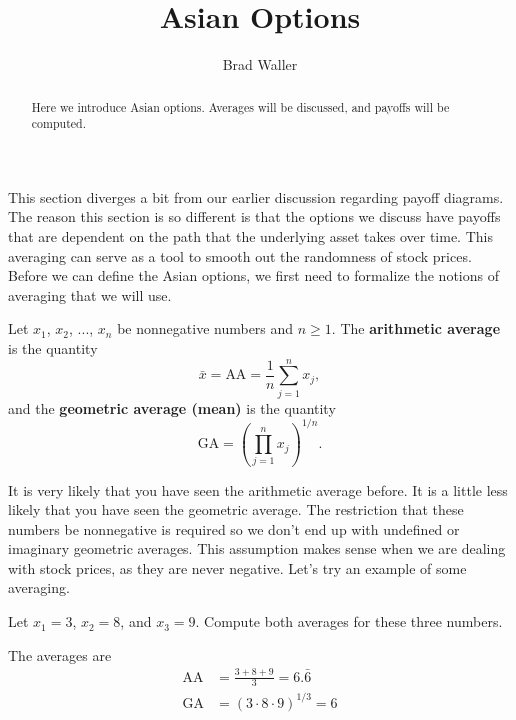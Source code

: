 \documentclass{ximera}
\author{Brad Waller}
\title{Asian Options}
\begin{document}
\begin{abstract}
Here we introduce Asian options. Averages will be discussed, and payoffs will be computed.
\end{abstract}

\maketitle

This section diverges a bit from our earlier discussion regarding payoff diagrams. The reason this section is so different is that the options we discuss have payoffs that are dependent on the path that the underlying asset takes over time. This averaging can serve as a tool to smooth out the randomness of stock prices. Before we can define the Asian options, we first need to formalize the notions of averaging that we will use.

\begin{definition}
Let $x_1$, $x_2$, ..., $x_n$ be nonnegative numbers and $n\geq 1$. The {\bf arithmetic average} is the quantity
	\begin{equation*}
	\bar{x}=\text{AA}=\frac{1}{n}\sum_{j=1}^n x_j,
	\end{equation*}
and the {\bf geometric average (mean)} is the quantity
	\begin{equation*}
	\text{GA}=\left(\prod_{j=1}^n x_j\right)^{1/n}.
	\end{equation*}
\end{definition}

It is very likely that you have seen the arithmetic average before. It is a little less likely that you have seen the geometric average. The restriction that these numbers be nonnegative is required so we don't end up with undefined or imaginary geometric averages. This assumption makes sense when we are dealing with stock prices, as they are never negative. Let's try an example of some averaging.

\begin{example}
Let $x_1=3$, $x_2=8$, and $x_3=9$. Compute both averages for these three numbers.
\end{example}

\begin{solution}
The averages are
	\begin{align*}
	\text{AA}&=\frac{3+8+9}{3}=6.\bar{6}\\
	\text{GA}&=(3\cdot 8\cdot 9)^{1/3}=6
	\end{align*}
\end{solution}
\end{document}
